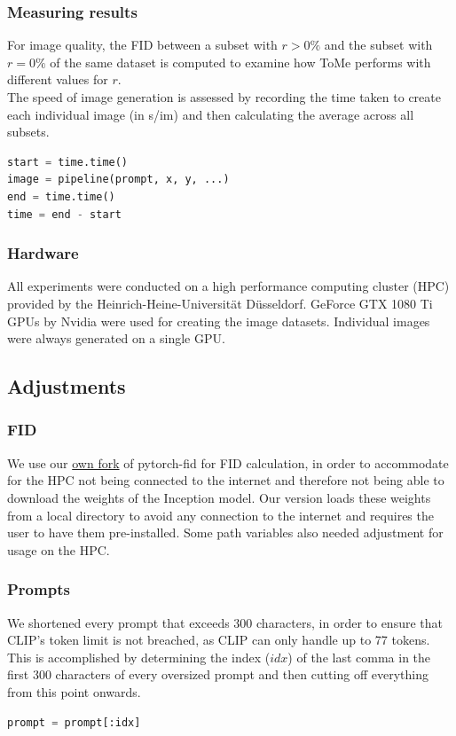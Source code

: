 \subsubsection*{Measuring results}
For image quality, the FID between a subset with \(r > 0\%\) and the subset with \(r = 0\%\) of the same dataset is computed to examine how ToMe performs with different values for \(r\).\\
The speed of image generation is assessed by recording the time taken to create each individual image (in s/im) and then calculating the average across all subsets.
\begin{lstlisting}[language=Python]
start = time.time()
image = pipeline(prompt, x, y, ...)
end = time.time()
time = end - start
\end{lstlisting}



\subsubsection*{Hardware}
All experiments were conducted on a high performance computing cluster (HPC) provided by the Heinrich-Heine-Universität Düsseldorf.
GeForce GTX 1080 Ti GPUs by Nvidia were used for creating the image datasets. Individual images were always generated on a single GPU.



\subsection{Adjustments}
\subsubsection*{FID}
We use our \href{https://github.com/HNR1/pytorch_fid}{own fork} of pytorch-fid \cite{Seitzer2020FID} for FID calculation, in order to accommodate for the HPC not being connected to the internet and therefore not being able to download the weights of the Inception model. Our version loads these weights from a local directory to avoid any connection to the internet and requires the user to have them pre-installed. Some path variables also needed adjustment for usage on the HPC.



\subsubsection*{Prompts}
We shortened every prompt that exceeds 300 characters, in order to ensure that CLIP's token limit is not breached, as CLIP can only handle up to 77 tokens.
This is accomplished by determining the index (\(idx\)) of the last comma in the first 300 characters of every oversized prompt and then cutting off everything from this point onwards.
\begin{lstlisting}[language=Python]
prompt = prompt[:idx]
\end{lstlisting}


